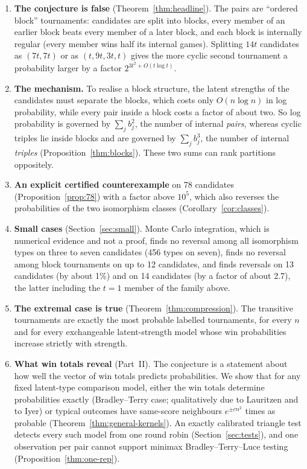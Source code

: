 \documentclass[11pt,a4paper]{article}
\theoremstyle{definition}
\begin{document}
\begin{enumerate}[leftmargin=*,label=(\alph*)]
\item \textbf{The conjecture is false} (Theorem~\ref{thm:headline}). The pairs are ``ordered block'' tournaments: candidates are split into blocks, every member of an earlier block beats every member of a later block, and each block is internally regular (every member wins half its internal games). Splitting $14t$ candidates as $(7t,7t)$ or as $(t,9t,3t,t)$ gives the more cyclic second tournament a probability larger by a factor $2^{3t^2+O(t\log t)}$.
\item \textbf{The mechanism.} To realise a block structure, the latent strengths of the candidates must separate the blocks, which costs only $O(n\log n)$ in log probability, while every pair inside a block costs a factor of about two. So log probability is governed by $\sum_j b_j^2$, the number of internal \emph{pairs}, whereas cyclic triples lie inside blocks and are governed by $\sum_j b_j^3$, the number of internal \emph{triples} (Proposition~\ref{thm:blocks}). These two sums can rank partitions oppositely.
\item \textbf{An explicit certified counterexample} on 78 candidates (Proposition~\ref{prop:78}) with a factor above $10^5$, which also reverses the probabilities of the two isomorphism classes (Corollary~\ref{cor:classes}).
\item \textbf{Small cases} (Section~\ref{sec:small}). Monte Carlo integration, which is numerical evidence and not a proof, finds no reversal among all isomorphism types on three to seven candidates (456 types on seven), finds no reversal among block tournaments on up to 12 candidates, and finds reversals on 13 candidates (by about 1\%) and on 14 candidates (by a factor of about 2.7), the latter including the $t=1$ member of the family above.
\item \textbf{The extremal case is true} (Theorem~\ref{thm:compression}). The transitive tournaments are exactly the most probable labelled tournaments, for every $n$ and for every exchangeable latent-strength model whose win probabilities increase strictly with strength.
\item \textbf{What win totals reveal} (Part~II). The conjecture is a statement about how well the vector of win totals predicts probabilities. We show that for any fixed latent-type comparison model, either the win totals determine probabilities exactly (Bradley--Terry case; qualitatively due to Lauritzen and to Iyer) or typical outcomes have same-score neighbours $e^{\pm cn^2}$ times as probable (Theorem~\ref{thm:general-kernels}). An exactly calibrated triangle test detects every such model from one round robin (Section~\ref{sec:tests}), and one observation per pair cannot support minimax Bradley--Terry--Luce testing (Proposition~\ref{thm:one-rep}).
\end{enumerate}
\end{document}

